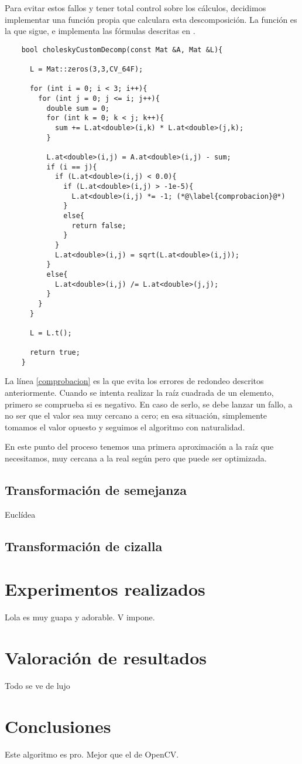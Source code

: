 \documentclass[a4paper, 11pt]{article}
\theoremstyle{definition}
\begin{document}
    Para evitar estos fallos y tener total control sobre los cálculos, decidimos implementar una función propia que calculara esta descomposición. La función es la que sigue, e implementa las fórmulas descritas en \cite{wikiChol}.
    \begin{lstlisting}
    bool choleskyCustomDecomp(const Mat &A, Mat &L){

      L = Mat::zeros(3,3,CV_64F);

      for (int i = 0; i < 3; i++){
        for (int j = 0; j <= i; j++){
          double sum = 0;
          for (int k = 0; k < j; k++){
            sum += L.at<double>(i,k) * L.at<double>(j,k);
          }

          L.at<double>(i,j) = A.at<double>(i,j) - sum;
          if (i == j){
            if (L.at<double>(i,j) < 0.0){
              if (L.at<double>(i,j) > -1e-5){
                L.at<double>(i,j) *= -1; (*@\label{comprobacion}@*)
              }
              else{
                return false;
              }
            }
            L.at<double>(i,j) = sqrt(L.at<double>(i,j));
          }
          else{
            L.at<double>(i,j) /= L.at<double>(j,j);
          }
        }
      }

      L = L.t();

      return true;
    }
    \end{lstlisting}

    La línea \ref{comprobacion} es la que evita los errores de redondeo descritos anteriormente. Cuando se intenta realizar la raíz cuadrada de un elemento, primero se comprueba si es negativo. En caso de serlo, se debe lanzar un fallo, a no ser que el valor sea muy cercano a cero; en esa situación, simplemente tomamos el valor opuesto y seguimos el algoritmo con naturalidad.

    En este punto del proceso tenemos una primera aproximación a la raíz que necesitamos, muy cercana a la real según \cite{LoopZhang} pero que puede ser optimizada.

    \subsection{Transformación de semejanza}
    Euclídea

    \subsection{Transformación de cizalla}

    \section{Experimentos realizados}

    Lola es muy guapa y adorable. V impone.

    \section{Valoración de resultados}

    Todo se ve de lujo

    \section{Conclusiones}

    Este algoritmo es pro. Mejor que el de OpenCV.
\end{document}
